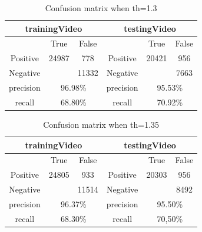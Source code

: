 \documentclass{article}
\begin{document}
\begin{table}[]
\centering
\begin{tabular}{|c|c|c|c|c|c|}
\hline
\multicolumn{3}{|c|}{trainingVideo} & \multicolumn{3}{c|}{testingVideo} \\ \hline
 & True & False &  & True & False \\ \hline
Positive & 24987 & 778 & Positive & 20421 & 956 \\ \hline
Negative &  & 11332 & Negative &  & 7663 \\ \hline
precision & \multicolumn{2}{c|}{96.98\%} & precision & \multicolumn{2}{c|}{95.53\%} \\ \hline
recall & \multicolumn{2}{c|}{68.80\%} & recall & \multicolumn{2}{c|}{70.92\%} \\ \hline
\end{tabular}
\caption{Confusion matrix when th=1.3}
\end{table}

\begin{table}[]
\centering
\begin{tabular}{|c|c|c|c|c|c|}
\hline
\multicolumn{3}{|c|}{trainingVideo} & \multicolumn{3}{c|}{testingVideo} \\ \hline
 & True & False &  & True & False \\ \hline
Positive & 24805 & 933 & Positive & 20303 & 956 \\ \hline
Negative &  & 11514 & Negative &  & 8492 \\ \hline
precision & \multicolumn{2}{c|}{96.37\%} & precision & \multicolumn{2}{c|}{95.50\%} \\ \hline
recall & \multicolumn{2}{c|}{68.30\%} & recall & \multicolumn{2}{c|}{70,50\%} \\ \hline
\end{tabular}
\caption{Confusion matrix when th=1.35}
\end{table}
\end{document}
